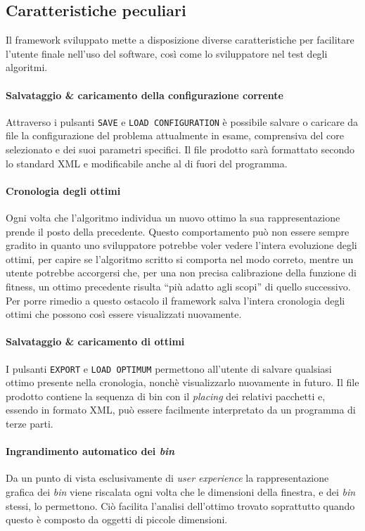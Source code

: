 \subsection{Caratteristiche peculiari}
Il framework sviluppato mette a disposizione diverse caratteristiche per facilitare l'utente finale nell'uso del software, così come lo sviluppatore nel test degli algoritmi.
\paragraph{Salvataggio \& caricamento della configurazione corrente}
Attraverso i pulsanti \texttt{SAVE} e \texttt{LOAD CONFIGURATION} è possibile salvare o caricare da file la configurazione del problema attualmente in esame, comprensiva del core selezionato e dei suoi parametri specifici. Il file prodotto sarà formattato secondo lo standard XML e modificabile anche al di fuori del programma.
\paragraph{Cronologia degli ottimi}
Ogni volta che l'algoritmo individua un nuovo ottimo la sua rappresentazione prende il posto della precedente. Questo comportamento può non essere sempre gradito in quanto uno sviluppatore potrebbe voler vedere l'intera evoluzione degli ottimi, per capire se l'algoritmo scritto si comporta nel modo correto, mentre un utente potrebbe accorgersi che, per una non precisa calibrazione della funzione di fitness, un ottimo precedente risulta ``più adatto agli scopi'' di quello successivo. Per porre rimedio a questo ostacolo il framework salva l'intera cronologia degli ottimi che possono così essere visualizzati nuovamente.
\paragraph{Salvataggio \& caricamento di ottimi}
I pulsanti \texttt{EXPORT} e \texttt{LOAD OPTIMUM} permettono all'utente di salvare qualsiasi ottimo presente nella cronologia, nonchè visualizzarlo nuovamente in futuro. Il file prodotto contiene la sequenza di bin con il \emph{placing} dei relativi pacchetti e, essendo in formato XML, può essere facilmente interpretato da un programma di terze parti.
\paragraph{Ingrandimento automatico dei \emph{bin}}
Da un punto di vista esclusivamente di \emph{user experience} la rappresentazione grafica dei \emph{bin} viene riscalata ogni volta che le dimensioni della finestra, e dei \emph{bin} stessi, lo permettono. Ciò facilita l'analisi dell'ottimo trovato soprattutto quando questo è composto da oggetti di piccole dimensioni.

